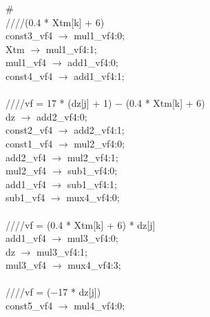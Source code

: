 \# \\
\hspace*{2em}////(0.4 * Xtm[k] + 6) \\
\hspace*{2em}const3\_vf4 $\rightarrow$ mul1\_vf4:0; \\
\hspace*{2em}Xtm $\rightarrow$ mul1\_vf4:1; \\
\hspace*{2em}mul1\_vf4 $\rightarrow$ add1\_vf4:0; \\
\hspace*{2em}const4\_vf4 $\rightarrow$ add1\_vf4:1; \\
   \\
   \hspace*{2em}////vf = 17 * (dz[j] + 1) $-$ (0.4 * Xtm[k] + 6) \\
   \hspace*{2em}dz $\rightarrow$ add2\_vf4:0; \\
   \hspace*{2em}const2\_vf4 $\rightarrow$ add2\_vf4:1; \\
   \hspace*{2em}const1\_vf4 $\rightarrow$ mul2\_vf4:0; \\
   \hspace*{2em}add2\_vf4 $\rightarrow$ mul2\_vf4:1; \\
   \hspace*{2em}mul2\_vf4 $\rightarrow$ sub1\_vf4:0; \\
   \hspace*{2em}add1\_vf4 $\rightarrow$ sub1\_vf4:1; \\
   \hspace*{2em}sub1\_vf4 $\rightarrow$ mux4\_vf4:0; \\
   \\
   \hspace*{2em}////vf = (0.4 * Xtm[k] + 6) * dz[j] \\
   \hspace*{2em}add1\_vf4 $\rightarrow$ mul3\_vf4:0; \\
   \hspace*{2em}dz $\rightarrow$ mul3\_vf4:1; \\
   \hspace*{2em}mul3\_vf4 $\rightarrow$ mux4\_vf4:3; \\
   \\
   \hspace*{2em}////vf = ($-$17 * dz[j]) \\
   \hspace*{2em}const5\_vf4 $\rightarrow$ mul4\_vf4:0; \\
